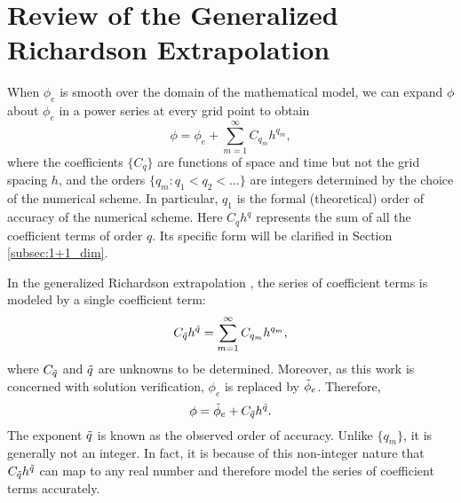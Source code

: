 \section{Review of the Generalized Richardson Extrapolation} \label{sec:review_GRE}
When $\phi_{e}$ is smooth over the domain of the mathematical model, we can expand $\phi$ about $\phi_{e}$ in a power series at every grid point to obtain
\begin{equation} \label{eq:model_orig}
    \phi = \phi_{e} + \sum_{m=1}^{\infty} C_{q_m} h^{q_m},
\end{equation}
where the coefficients $\{C_{q}\}$ are functions of space and time but not the grid spacing $h$, and the orders $\{q_m: q_1 < q_2 < \dots \}$ are integers determined by the choice of the numerical scheme. In particular, $q_1$ is the formal (theoretical) order of accuracy of the numerical scheme. Here $C_{q} h^{q}$ represents the sum of all the coefficient terms of order $q$. Its specific form will be clarified in Section \ref{subsec:1+1_dim}.

In the generalized Richardson extrapolation \citep{Roache1994Perspective:Studies,Roy2010}, the series of coefficient terms is modeled by a single coefficient term:
\begin{equation} \label{eq:coef_term_GRE}
    C_{\Tilde{q}} h^{\Tilde{q}} = \sum_{m=1}^{\infty} C_{q_m} h^{q_m},
\end{equation}
where $C_{\Tilde{q}}$ and ${\Tilde{q}}$ are unknowns to be determined. Moreover, as this work is concerned with solution verification, ${\phi}_{e}$ is replaced by $\Tilde{\phi}_{e}$. Therefore,
\begin{equation}
    \phi = \Tilde{\phi}_{e} + C_{\Tilde{q}} h^{\Tilde{q}}.
\end{equation}
The exponent $\Tilde{q}$ is known as the observed order of accuracy. Unlike $\{q_m\}$, it is generally not an integer. In fact, it is because of this non-integer nature that $C_{\Tilde{q}} h^{\Tilde{q}}$ can map to any real number and therefore model the series of coefficient terms accurately.

